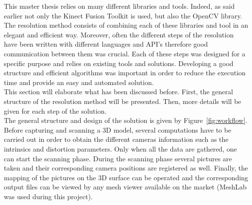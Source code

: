 This master thesis relies on many different libraries and tools. Indeed, as said earlier not only the Kinect Fusion Toolkit is used, but also the OpenCV library. The resolution method consists of combining each of these libraries and tool in an elegant and efficient way. Moreover, often the different steps of the resolution have been written with different languages and API's therefore good communication between them was crucial. Each of these steps was designed for a specific purpose and relies on existing tools and solutions. Developing a good structure and efficient algorithms was important in order to reduce the execution time and provide an easy and automated solution.\\

This section will elaborate what has been discussed before. First, the general structure of the resolution method will be presented. Then, more details will be given for each step of the solution.\\

The general structure and design of the solution is given by Figure~\ref{fig:workflow}. Before capturing and scanning a 3D model, several computations have to be carried out in order to obtain the different cameras information such as the intrinsics and distortion parameters. Only when all the data are gathered, one can start the scanning phase. During the scanning phase several pictures are taken and their corresponding camera positions are registered as well. Finally, the mapping of the pictures on the 3D surface can be operated and the corresponding output files can be viewed by any mesh viewer available on the market (MeshLab was used during this project).\\


